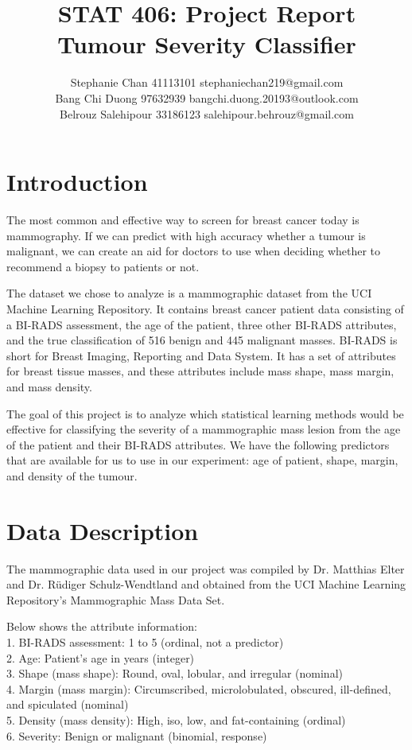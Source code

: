 \documentclass[11pt]{article}
\title{{\myfont STAT 406: Project Report\\Tumour Severity Classifier}}
\author{Stephanie Chan 41113101 stephaniechan219@gmail.com\\	Bang Chi Duong 97632939 bangchi.duong.20193@outlook.com\\Belrouz Salehipour 33186123 salehipour.behrouz@gmail.com
}
\date{\vspace{-5ex}}
\date{}  %
\begin{document}
	\maketitle
	
	\section{Introduction}
	The most common and effective way to screen for breast cancer today is mammography. If we can predict with high accuracy whether a tumour is malignant, we can create an aid for doctors to use when deciding whether to recommend a biopsy to patients or not.

	The dataset we chose to analyze is a mammographic dataset from the UCI Machine Learning Repository. It contains breast cancer patient data consisting of a BI-RADS assessment, the age of the patient, three other BI-RADS attributes, and the true classification of 516 benign and 445 malignant masses. BI-RADS is short for Breast Imaging, Reporting and Data System. It has a set of attributes for breast tissue masses, and these attributes include mass shape, mass margin, and mass density.
	
	The goal of this project is to analyze which statistical learning methods would be effective for classifying the severity of a mammographic mass lesion from the age of the patient and their BI-RADS attributes. We have the following predictors that are available for us to use in our experiment: age of patient, shape, margin, and density of the tumour.

	\section{Data Description}
	The mammographic data used in our project was compiled by Dr. Matthias Elter and Dr. Rüdiger Schulz-Wendtland and obtained from the UCI Machine Learning Repository's Mammographic Mass Data Set.
	
	Below shows the attribute information: \\
	1. BI-RADS assessment: 1 to 5 (ordinal, not a predictor) \\
	2. Age: Patient's age in years (integer) \\
	3. Shape (mass shape): Round, oval, lobular, and irregular (nominal) \\
	4. Margin (mass margin): Circumscribed, microlobulated, obscured, ill-defined, and spiculated (nominal) \\
	5. Density (mass density): High, iso, low, and fat-containing (ordinal) \\
	6. Severity: Benign or malignant (binomial, response)
	
\end{document}
